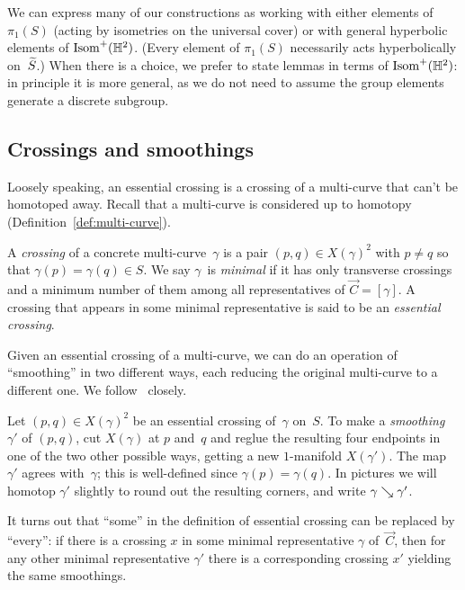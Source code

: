 We can express many of our constructions as working with either
elements of $\pi_1(S)$ (acting by isometries on the universal cover)
or with general hyperbolic elements of $\operatorname{Isom}^+(\mathbb{H}^2)$.
(Every element of $\pi_1(S)$ necessarily acts hyperbolically on~$\widetilde{S}$.)
When there is a choice, we prefer to state lemmas in terms
of $\operatorname{Isom}^+(\mathbb{H}^2)$: in principle it is more general, as we do
not need to assume the group elements generate a discrete subgroup.


\subsection{Crossings and smoothings}
\label{subsec:crossings}

Loosely speaking, an essential crossing is a crossing of a
multi-curve that can't be homotoped away. Recall that a multi-curve is
considered up to homotopy (Definition~\ref{def:multi-curve}).

\begin{definition}\label{def:essential-crossing}
  A \emph{crossing} of a concrete multi-curve~$\gamma$ is a pair
  $(p,q) \in X(\gamma)^2$ with $p \ne q$ so that
  $\gamma(p) = \gamma(q) \in S$. We say $\gamma$~is \emph{minimal} if
  it has only transverse crossings and a minimum number of
  them among all representatives of $\vec C = [\gamma]$.
  A crossing that appears in some minimal representative is said
  to be an \emph{essential crossing}.
\end{definition}

Given an essential crossing of a multi-curve, we can do an operation
of ``smoothing'' in two different ways, each reducing the original
multi-curve to a different one.
We follow~\cite{MGT25:SmoothingsErratum} closely.


\begin{definition}[smoothings]
  \label{def:smoothing}
  Let $(p,q) \in X(\gamma)^2$ be an essential crossing of~$\gamma$
  on~$S$. To make a \emph{smoothing}~$\gamma'$ of $(p,q)$, cut
  $X(\gamma)$ at $p$ and~$q$ and reglue the resulting four endpoints
  in one of the two other possible ways, getting a new $1$-manifold
  $X(\gamma')$. The map $\gamma'$ agrees with~$\gamma$; this is
  well-defined since $\gamma(p) = \gamma(q)$. In pictures we will
  homotop $\gamma'$ slightly to round out the resulting
  corners, and write $\gamma \mathrel{\searrow} \gamma'$.
\end{definition}

It turns out that ``some'' in the definition of essential crossing can be replaced by ``every'': if there is a crossing $x$ in some minimal representative $\gamma$ of~$\vec C$, then for any other minimal representative $\gamma'$ there is a corresponding crossing $x'$ yielding the same smoothings.



